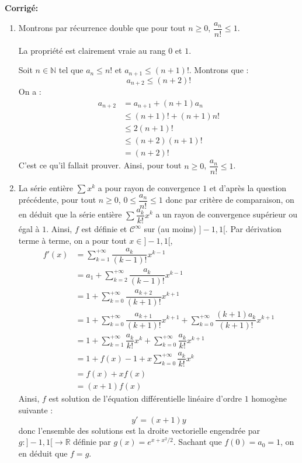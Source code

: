 \documentclass[a4paper,twoside,french,11pt]{VcCours}
\newcommand{\corr}{\textbf{Corrigé:}}
\begin{document}
\corr \begin{enumerate}
\item Montrons par récurrence double que pour tout $n \geq 0$, $\dfrac{a_n}{n!} \leq 1$.


La propriété est clairement vraie au rang $0$ et $1$.


Soit $n \in \mathbb{N}$ tel que $a_n \leq n!$ et $a_{n+1} \leq (n+1)!$. Montrons que :
$$ a_{n+2} \leq (n+2)!$$
On a :
\begin{align*}
a_{n+2} & = a_{n+1} + (n+1)a_n \\
& \leq (n+1)! + (n+1) n! \\
& \leq 2(n+1)! \\
& \leq (n+2)(n+1)! \\
& = (n+2)!
\end{align*}
C'est ce qu'il fallait prouver. Ainsi, pour tout $n \geq 0$, $\dfrac{a_n}{n!} \leq 1$.
\item La série entière $\sum x^k $ a pour rayon de convergence $1$ et d'après la question précédente, pour tout $n \geq 0$, $0 \leq \dfrac{a_n}{n!} \leq 1$ donc par critère de comparaison, on en déduit que la série entière $\sum \dfrac{a_k}{k!}x^k$ a un rayon de convergence supérieur ou égal à $1$. Ainsi, $f$ est définie et $\mathcal{C}^{\infty}$ sur (au moins) $]-1,1[$. Par dérivation terme à terme, on a pour tout $x \in ]-1,1[$,
\begin{align*}
f'(x) & = \sum_{k=1}^{+ \infty} \dfrac{a_k}{(k-1)!} x^{k-1} \\
& = a_1 + \sum_{k=2}^{+ \infty} \dfrac{a_k}{(k-1)!} x^{k-1} \\
& = 1 + \sum_{k=0}^{+ \infty} \dfrac{a_{k+2}}{(k+1)!} x^{k+1} \\
& = 1+ \sum_{k=0}^{+ \infty} \dfrac{a_{k+1}}{(k+1)!} x^{k+1}  + \sum_{k=0}^{+ \infty} \dfrac{(k+1)a_{k}}{(k+1)!} x^{k+1} \\
& = 1+ \sum_{k=1}^{+ \infty} \dfrac{a_{k}}{k!} x^{k} +  \sum_{k=0}^{+ \infty} \dfrac{a_{k}}{k!} x^{k+1} \\
& = 1+ f(x)-1  + x \sum_{k=0}^{+ \infty} \dfrac{a_{k}}{k!} x^{k} \\
& = f(x)+xf(x) \\
& = (x+1)f(x)
\end{align*} 
Ainsi, $f$ est solution de l'équation différentielle linéaire d'ordre $1$ homogène suivante :
$$ y'=(x+1)y$$
donc l'ensemble des solutions est la droite vectorielle engendrée par $g : ]-1,1[ \rightarrow \mathbb{R}$ définie par $g(x)=e^{x+x^2/2}$. Sachant que $f(0)=a_0=1$, on en déduit que $f=g$.

\end{enumerate}
\end{document}

